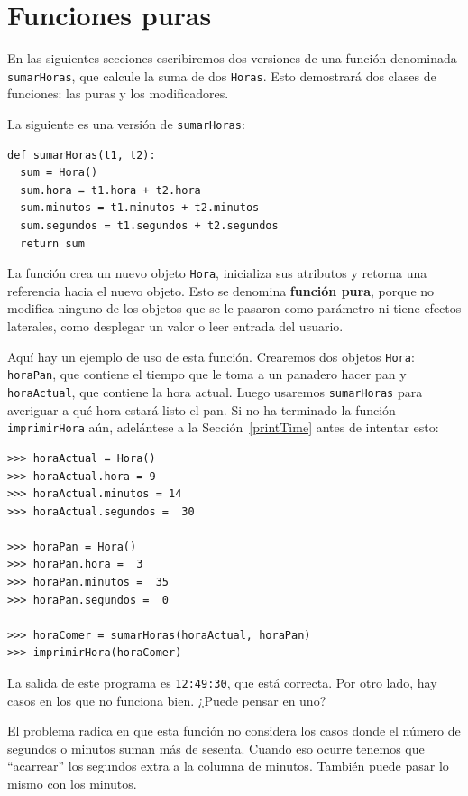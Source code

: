 \section{Funciones puras}

En las siguientes secciones escribiremos dos versiones de una
función denominada \texttt{sumarHoras}, que calcule la suma
de dos   \texttt{Horas}. Esto demostrará dos clases de funciones:
las puras y los modificadores.

La siguiente es una versión de  \texttt{sumarHoras}:

\beforeverb
\begin{verbatim}
def sumarHoras(t1, t2):
  sum = Hora()
  sum.hora = t1.hora + t2.hora
  sum.minutos = t1.minutos + t2.minutos
  sum.segundos = t1.segundos + t2.segundos
  return sum
\end{verbatim}
\afterverb
%
La función crea un nuevo objeto  \texttt{Hora}, inicializa
sus atributos y retorna una referencia hacia el nuevo objeto.
Esto se denomina {\bf función pura}, porque no modifica ninguno
de los objetos que se le pasaron como parámetro ni tiene
efectos laterales, como desplegar un valor o leer entrada
del usuario.

Aquí hay un ejemplo de uso de esta función. Crearemos dos
objetos  {\tt Hora}: \texttt{horaPan}, que contiene el tiempo que le toma a un panadero
hacer pan y \texttt{horaActual}, que contiene la hora actual. Luego usaremos \texttt{sumarHoras} para averiguar
a qué hora estará listo el pan. Si no ha terminado la función {\tt
imprimirHora} aún, adelántese a la Sección~\ref{printTime} antes
de intentar esto:

\beforeverb
\begin{verbatim}
>>> horaActual = Hora()
>>> horaActual.hora = 9
>>> horaActual.minutos = 14
>>> horaActual.segundos =  30

>>> horaPan = Hora()
>>> horaPan.hora =  3
>>> horaPan.minutos =  35
>>> horaPan.segundos =  0

>>> horaComer = sumarHoras(horaActual, horaPan)
>>> imprimirHora(horaComer)
\end{verbatim}
\afterverb
%
La salida de este programa es \texttt{12:49:30}, que está correcta. Por
otro lado, hay casos en los que no funciona bien. ¿Puede pensar en uno?

El problema radica en que esta función no considera los casos donde
el número de segundos o minutos suman más de sesenta. Cuando eso 
ocurre tenemos que  ``acarrear'' los segundos extra a la columna
de  minutos. También puede pasar lo mismo con los minutos.

